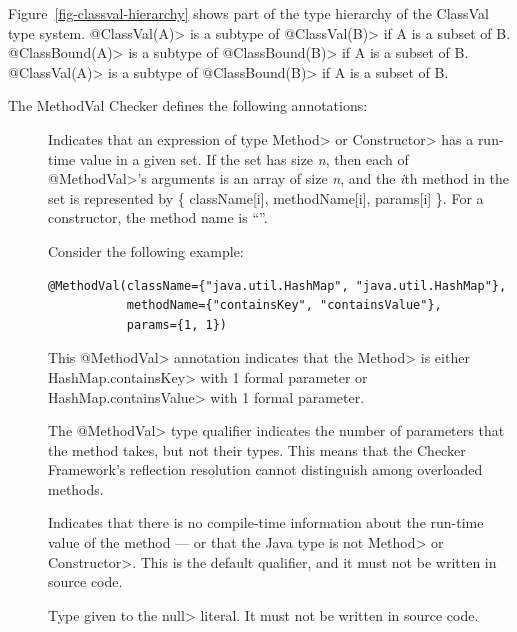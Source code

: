 Figure~\ref{fig-classval-hierarchy} shows part of the type hierarchy of the
ClassVal type system.
\<@ClassVal(A)> is a subtype of \<@ClassVal(B)> if A is a subset of B.
\<@ClassBound(A)> is a subtype of \<@ClassBound(B)> if A is a subset of B.
\<@ClassVal(A)> is a subtype of \<@ClassBound(B)> if A is a subset of B.



The MethodVal Checker defines the following annotations:

\begin{description}
\item[]
Indicates that an expression of type \<Method> or \<Constructor> has a
run-time value in a given set.  If the set has size \textit{n}, then each of
\<@MethodVal>'s arguments is an array of size \textit{n}, and the \textit{i}th method in the set is
represented by \{ className[i], methodName[i], params[i] \}.
For a constructor, the method name is ``''.

Consider the following example:

\begin{Verbatim}
@MethodVal(className={"java.util.HashMap", "java.util.HashMap"},
           methodName={"containsKey", "containsValue"},
           params={1, 1})
\end{Verbatim}

\noindent
This \<@MethodVal> annotation indicates that the \<Method>
is either \<HashMap.containsKey> with 1 formal parameter or
\<HashMap.containsValue> with 1 formal parameter.

The \<@MethodVal> type qualifier indicates the number of
parameters that the method takes, but not their types.  This means that the
Checker Framework's reflection resolution cannot distinguish among
overloaded methods.

\item[] Indicates that there is no
  compile-time information about the run-time value of the method --- or
  that the Java type is not \<Method> or \<Constructor>.
  This is the default qualifier, and it must not be written in source code.

\item[] Type given to the \<null> literal.
  It must not be written in source code.
\end{description}

